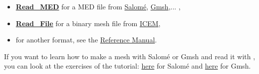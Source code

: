 \begin{itemize}
\item \href{\REFERENCEMANUAL\#readmed}{\textbf{Read\_MED}} for a MED file from \href{http://www.salome-platform.org}{Salom\'e}, \href{http://gmsh.info/}{Gmsh},... ,
\item \href{\REFERENCEMANUAL\#readfile}{\textbf{Read\_File}} for a binary mesh file from \href{http://resource.ansys.com/Products/Other+Products/ANSYS+ICEM+CFD}{ICEM},
\item for another format, see the \href{\REFERENCEMANUAL\#read}{\trustref Reference Manual}.
\end{itemize}

If you want to learn how to make a mesh with Salom\'e or Gmsh and read it with \trust, you can look at the exercises of the \trust tutorial: \href{TRUST_tutorial.pdf\#salome}{here} for Salom\'e and \href{TRUST_tutorial.pdf\#gmsh}{here} for Gmsh.




